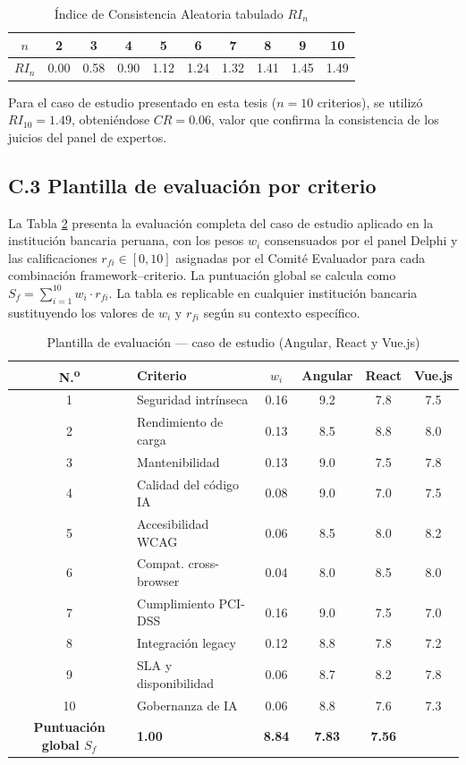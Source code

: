 \begin{table}[htbp]
\centering
\caption{Índice de Consistencia Aleatoria tabulado $RI_n$}
\label{tab:4.9}
\small
\begin{tabular}{@{}c*{9}{c}@{}}
\toprule
$n$   & 2    & 3    & 4    & 5    & 6    & 7    & 8    & 9    & 10 \\
\midrule
$RI_n$ & 0.00 & 0.58 & 0.90 & 1.12 & 1.24 & 1.32 & 1.41 & 1.45 & 1.49 \\
\bottomrule
\end{tabular}
\end{table}

Para el caso de estudio presentado en esta tesis ($n = 10$ criterios), se
utilizó $RI_{10} = 1.49$, obteniéndose $CR = 0.06$, valor que confirma la
consistencia de los juicios del panel de expertos.

\subsection*{C.3 Plantilla de evaluación por criterio}

La Tabla \ref{tab:4.10} presenta la evaluación completa del caso de estudio
aplicado en la institución bancaria peruana, con los pesos $w_i$
consensuados por el panel Delphi y las calificaciones $r_{fi} \in [0,10]$
asignadas por el Comité Evaluador para cada combinación framework--criterio.
La puntuación global se calcula como $S_f = \sum_{i=1}^{10} w_i \cdot
r_{fi}$. La tabla es replicable en cualquier institución bancaria
sustituyendo los valores de $w_i$ y $r_{fi}$ según su contexto específico.

\begin{table}[htbp]
\centering
\caption{Plantilla de evaluación --- caso de estudio (Angular, React y Vue.js)}
\label{tab:4.10}
\small
\begin{tabular}{@{}clcccc@{}}
\toprule
N.\textsuperscript{o} & Criterio & $w_i$ & Angular & React & Vue.js \\
\midrule
1  & Seguridad intrínseca         & 0.16 & 9.2 & 7.8 & 7.5 \\
2  & Rendimiento de carga         & 0.13 & 8.5 & 8.8 & 8.0 \\
3  & Mantenibilidad               & 0.13 & 9.0 & 7.5 & 7.8 \\
4  & Calidad del código IA        & 0.08 & 9.0 & 7.0 & 7.5 \\
5  & Accesibilidad WCAG           & 0.06 & 8.5 & 8.0 & 8.2 \\
6  & Compat. cross-browser        & 0.04 & 8.0 & 8.5 & 8.0 \\
7  & Cumplimiento PCI-DSS         & 0.16 & 9.0 & 7.5 & 7.0 \\
8  & Integración legacy           & 0.12 & 8.8 & 7.8 & 7.2 \\
9  & SLA y disponibilidad         & 0.06 & 8.7 & 8.2 & 7.8 \\
10 & Gobernanza de IA             & 0.06 & 8.8 & 7.6 & 7.3 \\
\midrule
\textbf{Puntuación global $S_f$} & \textbf{1.00} & \textbf{8.84} & \textbf{7.83} & \textbf{7.56} \\
\bottomrule
\end{tabular}
\end{table}

